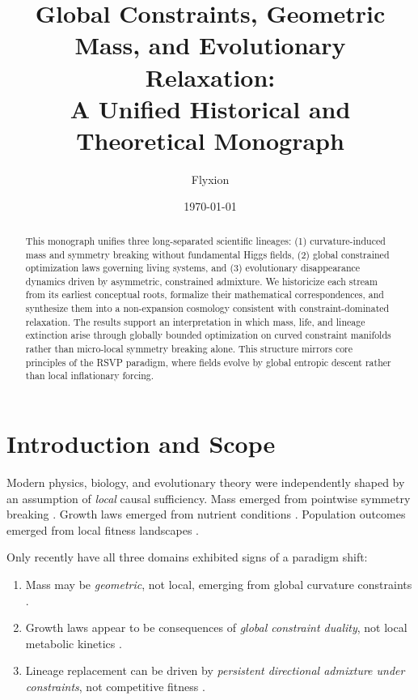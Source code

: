 \documentclass[11pt,a4paper]{article}
\title{\Large\bfseries Global Constraints, Geometric Mass, and Evolutionary Relaxation:\\
A Unified Historical and Theoretical Monograph}
\author{Flyxion}
\date{\today}
\begin{document}
\maketitle

\begin{abstract}
This monograph unifies three long-separated scientific lineages: (1) curvature-induced mass and symmetry breaking without fundamental Higgs fields, (2) global constrained optimization laws governing living systems, and (3) evolutionary disappearance dynamics driven by asymmetric, constrained admixture. We historicize each stream from its earliest conceptual roots, formalize their mathematical correspondences, and synthesize them into a non-expansion cosmology consistent with constraint-dominated relaxation. The results support an interpretation in which mass, life, and lineage extinction arise through globally bounded optimization on curved constraint manifolds rather than micro-local symmetry breaking alone. This structure mirrors core principles of the RSVP paradigm, where fields evolve by global entropic descent rather than local inflationary forcing.
\end{abstract}

\tableofcontents

\section{Introduction and Scope}

Modern physics, biology, and evolutionary theory were independently shaped by an assumption of \textit{local} causal sufficiency. Mass emerged from pointwise symmetry breaking \citep{Higgs1964}. Growth laws emerged from nutrient conditions \citep{Monod1949}. Population outcomes emerged from local fitness landscapes \citep{Fisher1930, Wright1931}.  

Only recently have all three domains exhibited signs of a paradigm shift:

\begin{enumerate}
    \item Mass may be \textit{geometric}, not local, emerging from global curvature constraints \citep{Pincak2025, Joyce2000, Bryant2006}.
    \item Growth laws appear to be consequences of \textit{global constraint duality}, not local metabolic kinetics \citep{Yamagishi2025}.
    \item Lineage replacement can be driven by \textit{persistent directional admixture under constraints}, not competitive fitness \citep{Amadei2025}.
\end{enumerate}
\end{document}
